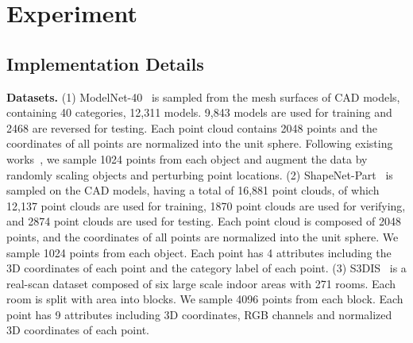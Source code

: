 \documentclass[journal]{IEEEtran}
\begin{document}
\section{Experiment} \label{sec:exp}

\subsection{Implementation Details}
\textbf{Datasets.}
(1) ModelNet-40~\cite{wu20153d} is sampled from the mesh surfaces of CAD models, containing 40 categories, 12,311 models. 9,843 models are used for training and 2468 are reversed for testing. Each point cloud contains 2048 points and the coordinates of all points are normalized into the unit sphere. Following existing works~\cite{wang2019dynamic, zheng2020parameter}, we sample 1024 points from each object and augment the data by randomly scaling objects and perturbing point locations. (2) ShapeNet-Part~\cite{2015shapenet} is sampled on the CAD models, having a total of 16,881 point clouds, of which 12,137 point clouds are used for training, 1870 point clouds are used for verifying, and 2874 point clouds are used for testing. Each point cloud is composed of 2048 points, and the coordinates of all points are normalized into the unit sphere. We sample 1024 points from each object. Each point has 4 attributes including the 3D coordinates of each point
and the category label of each point. (3) S3DIS~\cite{armeni20163d} is a real-scan dataset composed of six large scale indoor areas with 271 rooms. Each room is split with  area into blocks. We sample 4096 points from each block. Each point has 9 attributes including 3D coordinates, RGB channels and normalized 3D coordinates of each point. 
\end{document}

